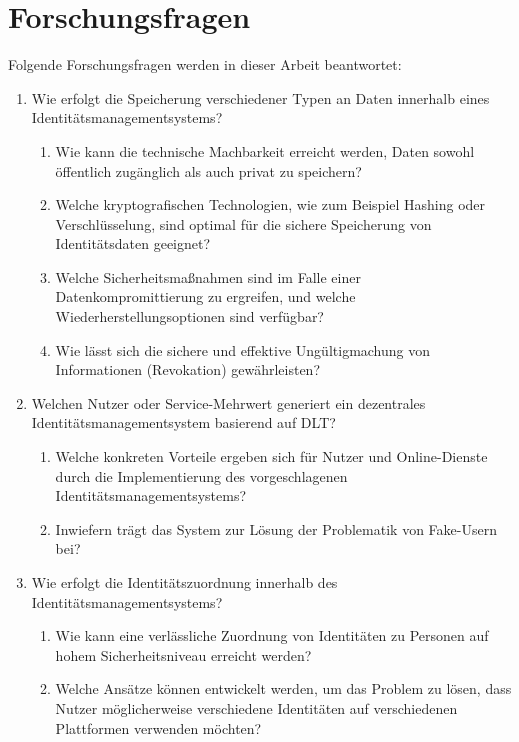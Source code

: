 \section{Forschungsfragen}
\label{forschungsfragen}
Folgende Forschungsfragen werden in dieser Arbeit beantwortet:
\begin{enumerate}
\item Wie erfolgt die Speicherung verschiedener Typen an Daten innerhalb eines Identitätsmanagementsystems?
\begin{enumerate}
	\item Wie kann die technische Machbarkeit erreicht werden, Daten sowohl öffentlich zugänglich als auch privat zu speichern?
	\item Welche kryptografischen Technologien, wie zum Beispiel Hashing oder Verschlüsselung, sind optimal für die sichere Speicherung von Identitätsdaten geeignet?
	\item Welche Sicherheitsmaßnahmen sind im Falle einer Datenkompromittierung zu ergreifen, und welche Wiederherstellungsoptionen sind verfügbar?
	\item Wie lässt sich die sichere und effektive Ungültigmachung von Informationen (Revokation) gewährleisten?
\end{enumerate}

\item Welchen Nutzer oder Service-Mehrwert generiert ein dezentrales Identitätsmanagementsystem basierend auf DLT?
\begin{enumerate}
	\item Welche konkreten Vorteile ergeben sich für Nutzer und Online-Dienste durch die Implementierung des vorgeschlagenen Identitätsmanagementsystems?
	\item Inwiefern trägt das System zur Lösung der Problematik von Fake-Usern bei?
\end{enumerate}

\item Wie erfolgt die Identitätszuordnung innerhalb des Identitätsmanagementsystems?
\begin{enumerate}
	\item Wie kann eine verlässliche Zuordnung von Identitäten zu Personen auf hohem Sicherheitsniveau erreicht werden?
	\item Welche Ansätze können entwickelt werden, um das Problem zu lösen, dass Nutzer möglicherweise verschiedene Identitäten auf verschiedenen Plattformen verwenden möchten?
\end{enumerate}


\end{enumerate}
